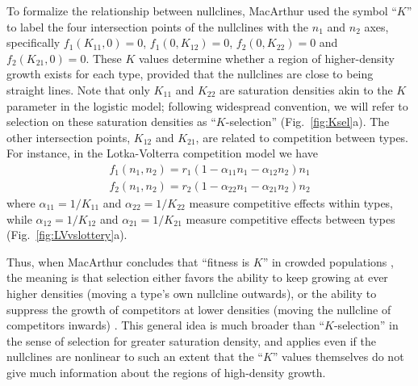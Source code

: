 \documentclass[12pt]{article}
\begin{document}
To formalize the relationship between nullclines, MacArthur used the symbol ``$K$'' to label the four intersection points of the nullclines with the $n_1$ and $n_2$ axes, specifically $f_1(K_{11},0)=0$, $f_1(0,K_{12})=0$, $f_2(0,K_{22})=0$ and $f_2(K_{21},0)=0$. These $K$ values determine whether a region of higher-density growth exists for each type, provided that the nullclines are close to being straight lines. Note that only $K_{11}$ and $K_{22}$ are saturation densities akin to the $K$ parameter in the logistic model; following widespread convention, we will refer to selection on these saturation densities as ``$K$-selection'' (Fig.~\ref{fig:Ksel}a). The other intersection points, $K_{12}$ and $K_{21}$, are related to competition between types. For instance, in the Lotka-Volterra competition model we have
\begin{align}
f_1(n_1,n_2) = r_1(1-\alpha_{11}n_1-\alpha_{12}n_2)n_1\nonumber\\
f_2(n_1,n_2) = r_2(1-\alpha_{22}n_1-\alpha_{21}n_2)n_2\label{eq:LV}
\end{align}
where $\alpha_{11}=1/K_{11}$ and $\alpha_{22}=1/K_{22}$ measure competitive effects within types, while $\alpha_{12}=1/K_{12}$ and $\alpha_{21}=1/K_{21}$ measure competitive effects between types (Fig.~\ref{fig:LVvslottery}a). 

Thus, when MacArthur concludes that  ``fitness is $K$'' in crowded populations \citep[pp. 149]{macarthur_1967}, the meaning is that selection either favors the ability to keep growing at ever higher densities (moving a type's own nullcline outwards), or the ability to suppress the growth of competitors at lower densities (moving the nullcline of competitors inwards) \citep{gill_1974}. This general idea is much broader than ``$K$-selection'' in the sense of selection for greater saturation density, and applies even if the nullclines are nonlinear to such an extent that the ``$K$'' values themselves do not give much information about the regions of high-density growth.
\end{document}
